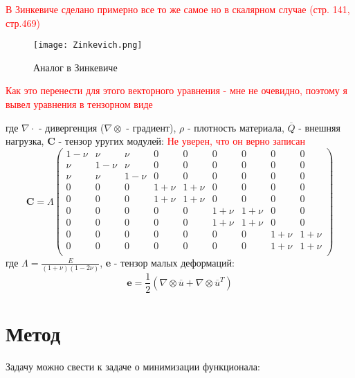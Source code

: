 \documentclass[a4paper,12pt]{article}
\begin{document}
\textcolor{red}{В Зинкевиче сделано примерно все то же самое но в скалярном случае (стр. 141, стр.469)}
\begin{figure}[H]
    \texttt{[image: Zinkevich.png]}
    \caption{Аналог в Зинкевиче}
    \label{fig:enter-label}
\end{figure}
\textcolor{red}{Как это перенести для этого векторного уравнения - мне не очевидно, поэтому я вывел уравнения в тензорном виде} \par
где $\nabla \cdot$ - дивергенция ($\nabla \otimes $ - градиент), $\rho$ - плотность материала, $\overline{Q}$ - внешняя нагрузка, $\textbf{C}$ - тензор уругих модулей: \textcolor{red}{Не уверен, что он верно записан}
\begin{equation}
\textbf{C} = \Lambda
\begin{pmatrix}
    1-\nu & \nu & \nu &  0 & 0 &0 &0 &0 & 0 \\
    \nu & 1-\nu & \nu & 0 & 0 & 0 & 0&0 &0 \\
    \nu & \nu & 1-\nu & 0&0&0&0&0&0\\
    0 & 0 & 0 & 1+\nu & 1+\nu & 0 &0 &0&0 \\
    0 & 0 & 0 & 1+\nu & 1+\nu & 0 &0 &0&0 \\
    0&0 &0 &0 &0 &1+\nu &1+\nu &0 &0 \\
    0&0 &0 &0 &0 &1+\nu &1+\nu &0 &0 \\
    0&0 &0 &0 &0 &0 &0 &1+\nu &1+\nu \\
    0&0 &0 &0 &0 &0 &0 &1+\nu &1+\nu \\
    
\end{pmatrix}
\end{equation}
где $\Lambda = \frac{E}{(1+\nu)(1-2\nu)}$, \textbf{e} - тензор малых деформаций:
\begin{equation}
    \textbf{e} = \frac{1}{2}(\nabla \otimes \overline{u} + \nabla \otimes \overline{u}^T)
\end{equation}
\section{Метод}
Задачу можно свести к задаче о минимизации функционала:

        
\end{document}
